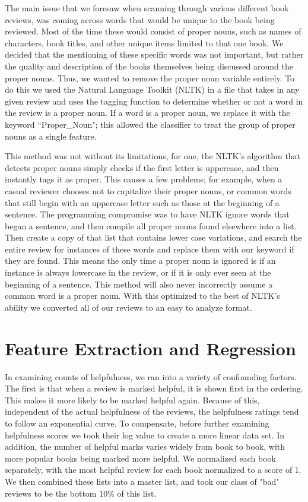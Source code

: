 \documentclass{article}
\begin{document}
\begin{multicols}{2}
The main issue that we foresaw when scanning through various different book reviews, was coming across words that would be unique to the book being reviewed. Most of the time these would consist of proper nouns, such as names of characters, book titles, and other unique items limited to that one book. We decided that the mentioning of these specific words was not important, but rather the quality and description of the books themselves being discussed around the proper nouns. Thus, we wanted to remove the proper noun variable entirely. To do this we used the Natural Language Toolkit (NLTK)\cite{nltk} in a file that takes in any given review and uses the tagging function to determine whether or not a word in the review is a proper noun. If a word is a proper noun, we replace it with the keyword “Proper\_Noun"; this allowed the classifier to treat the group of proper nouns as a single feature. 
 
This method was not without its limitations, for one, the NLTK’s algorithm that detects proper nouns simply checks if the first letter is uppercase, and then instantly tags it as proper. This causes a few problems; for example, when a casual reviewer chooses not to capitalize their proper nouns, or common words that still begin with an uppercase letter such as those at the beginning of a sentence. The programming compromise was to have NLTK ignore words that began a sentence, and then compile all proper nouns found elsewhere into a list. Then create a copy of that list that contains lower case variations, and search the entire review for instances of these words and replace them with our keyword if they are found. This means the only time a proper noun is ignored is if an instance is always lowercase in the review, or if it is only ever seen at the beginning of a sentence. This method will also never incorrectly assume a common word is a proper noun. With this optimized to the best of NLTK’s ability we converted all of our reviews to an easy to analyze format.

\section{Feature Extraction and Regression}

In examining counts of helpfulness, we ran into a variety of confounding factors. The first is that when a review is marked helpful, it is shown first in the ordering. This makes it more likely to be marked helpful again. Because of this, independent of the actual helpfulness of the reviews, the helpfulness ratings tend to follow an exponential curve. To compensate, before further examining helpfulness scores we took their log value to create a more linear data set. In addition, the number of helpful marks varies widely from book to book, with more popular books being marked more helpful. We normalized each book separately, with the most helpful review for each book normalized to a score of 1. We then combined these lists into a master list, and took our class of "bad" reviews to be the bottom 10\% of this list.


\end{multicols}
\end{document}
